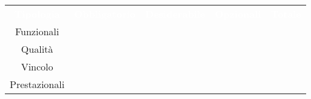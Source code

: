 \renewcommand{\arraystretch}{1.5}


\begin{longtable}{c c c c c} 
	
	\rowcolor{darkblue}
	\textcolor{white}{\textbf{Tipologia}}&
	\textcolor{white}{\textbf{Obbligatorio}}&
	\textcolor{white}{\textbf{Desiderabile}}&
	\textcolor{white}{\textbf{Opzionali}}&
	\textcolor{white}{\textbf{Totale}}\\
	
	Funzionali & \actualrfunO & \actualrfunD & \actualrfunZ & \actualrfun \\
	Qualità & \actualrquaO & \actualrquaD & \actualrquaZ & \actualrqua \\
	Vincolo & \actualrvinO & \actualrvinD & \actualrvinZ & \actualrvin \\
	Prestazionali & \actualrpreO & \actualrpreD & \actualrpreZ & \actualrpre \\

\end{longtable}
